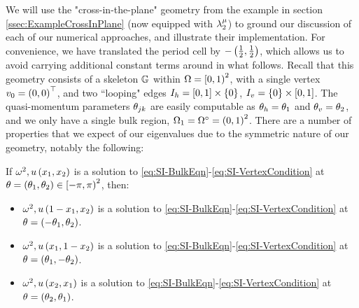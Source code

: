 We will use the "cross-in-the-plane" geometry from the example in section \ref{ssec:ExampleCrossInPlane} (now equipped with $\lambda_2^{\mu}$) to ground our discussion of each of our numerical approaches, and illustrate their implementation.
For convenience, we have translated the period cell by $-\left( \frac{1}{2},\frac{1}{2} \right)$, which allows us to avoid carrying additional constant terms around in what follows.
Recall that this geometry consists of a skeleton $\mathbb{G}$ within $\Omega=\left[0,1\right)^2$, with a single vertex $v_0=\left( 0,0 \right)^\top$, and two ``looping" edges $I_h = \left[ 0,1 \right]\times\left\{ 0 \right\}$, $I_v=\left\{ 0 \right\}\times\left[ 0,1 \right]$.
The quasi-momentum parameters $\theta_{jk}$ are easily computable as $\theta_h = \theta_1$ and $\theta_v = \theta_2$, and we only have a single bulk region, $\Omega_1 = \Omega^{\circ}=\left( 0,1 \right)^2$.
There are a number of properties that we expect of our eigenvalues due to the symmetric nature of our geometry, notably the following:
\begin{prop} \label{prop:CrossInPlaneSymmetries}
	If $\omega^2, u\left( x_1,x_2 \right)$ is a solution to \eqref{eq:SI-BulkEqn}-\eqref{eq:SI-VertexCondition} at $\theta = \left( \theta_1,\theta_2 \right)\in\left[-\pi,\pi\right)^2$, then:
	\begin{itemize}
		\item $\omega^2, u\left( 1-x_1,x_2 \right)$ is a solution to \eqref{eq:SI-BulkEqn}-\eqref{eq:SI-VertexCondition} at $\theta = \left( -\theta_1, \theta_2 \right)$.
		\item $\omega^2, u\left( x_1,1-x_2 \right)$ is a solution to \eqref{eq:SI-BulkEqn}-\eqref{eq:SI-VertexCondition} at $\theta = \left( \theta_1, -\theta_2 \right)$.
		\item $\omega^2, u\left( x_2,x_1 \right)$ is a solution to \eqref{eq:SI-BulkEqn}-\eqref{eq:SI-VertexCondition} at $\theta = \left( \theta_2, \theta_1 \right)$.
	\end{itemize}
\end{prop}

